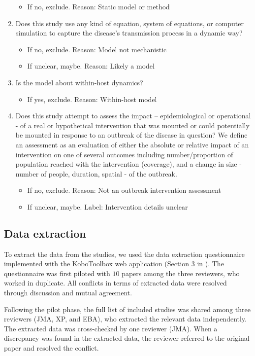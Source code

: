 \documentclass[10pt,letterpaper]{article}
\begin{document}
\begin{enumerate}
\begin{itemize}
		\item 	If no, exclude. Reason: Static model or method
	\end{itemize}
	\item Does this study use any kind of equation, system of equations, or computer simulation to capture the disease’s transmission process in a dynamic way?
	\begin{itemize}
		\item 	If no, exclude. Reason: Model not mechanistic
		\item 	If unclear, maybe. Reason: Likely a model
	\end{itemize}
	\item Is the model about within-host dynamics?
	\begin{itemize}
		\item 	If yes, exclude. Reason: Within-host model
	\end{itemize}
	\item Does this study attempt to assess the impact – epidemiological or operational - of a real or hypothetical intervention that was mounted or could potentially be mounted in response to an outbreak of the disease in question? We define an assessment as an evaluation of either the absolute or relative impact of an intervention on one of several outcomes including number/proportion of population reached with the intervention (coverage), and a change in size - number of people, duration, spatial - of the outbreak.
	\begin{itemize}
		\item 	If no, exclude. Reason: Not an outbreak intervention assessment
		\item 	If unclear, maybe. Label: Intervention details unclear
	\end{itemize}
\end{enumerate}

\subsection*{Data extraction}
To extract the data from the studies, we used the data extraction questionnaire implemented with the KoboToolbox web application (Section 3 in ). The questionnaire was first piloted with $10$ papers among the three reviewers, who worked in duplicate. All conflicts in terms of extracted data were resolved through discussion and mutual agreement. 

Following the pilot phase, the full list of included studies was shared among three reviewers (JMA, XP, and EBA), who extracted the relevant data independently. The extracted data was cross-checked by one reviewer (JMA). When a discrepancy was found in the extracted data, the reviewer referred to the original paper and resolved the conflict.  
\end{document}
